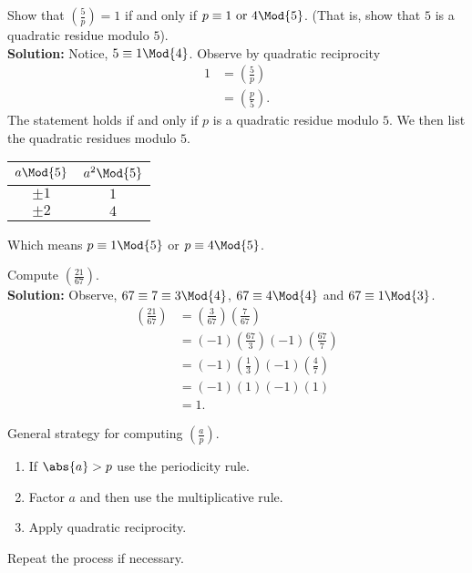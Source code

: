 \documentclass[12pt, a4paper]{article}
\begin{document}
\begin{mdexample}
    Show that \(\left( \frac{5}{p} \right) =1\) if and only if \(p \equiv 1 \text{ or } 4 \Mod{5}\). (That is, show that \(5\) is a quadratic residue modulo \(5\)). \\
    \textbf{Solution:} Notice, \(5 \equiv 1 \Mod{4}\). Observe by quadratic reciprocity
    \[\begin{aligned}
        1 &=\left( \frac{5}{p} \right) \\
        &= \left( \frac{p}{5} \right).
    \end{aligned}\]
    The statement holds if and only if \(p\) is a quadratic residue modulo \(5\). We then list the quadratic residues modulo \(5\).
    \begin{table}[H]
        \begin{center}
            \begin{tabular}{c|c}
                \(a \Mod{5}\) & \(a^2 \Mod{5}\) \\ \hline
                \(\pm 1\)          &      \(1\)      \\
                \(\pm 2\)          &      \(4\)      
                \end{tabular}
        \end{center}
    \end{table}
    Which means \(p \equiv 1 \Mod{5}\) or \(p\equiv 4 \Mod{5}\).
\end{mdexample}

\begin{example}
    Compute \(\left( \frac{21}{67} \right)\). \\
    \textbf{Solution:} Observe, \(67 \equiv 7 \equiv 3 \Mod{4}\), \(67 \equiv 4 \Mod{4}\) and \(67 \equiv 1 \Mod{3}\).
    \[\begin{aligned}
        \left( \frac{21}{67} \right) &= \left( \frac{3}{67} \right) \left( \frac{7}{67} \right) \\
        &= (-1)\left( \frac{67}{3} \right) (-1)\left( \frac{67}{7} \right) \\\
        &= (-1)\left( \frac{1}{3} \right) (-1)\left( \frac{4}{7} \right)\\
        &= (-1)(1)(-1)(1)\\
        &= 1.
    \end{aligned}\]
\end{example}

\begin{mdremark}
    General strategy for computing \(\left( \frac{a}{p} \right)\).
    \begin{enumerate}
        \item If \(\abs{a}>p\) use the periodicity rule.
        \item Factor \(a\) and then use the multiplicative rule.
        \item Apply quadratic reciprocity.
    \end{enumerate}
    Repeat the process if necessary.
\end{mdremark}
\end{document}
